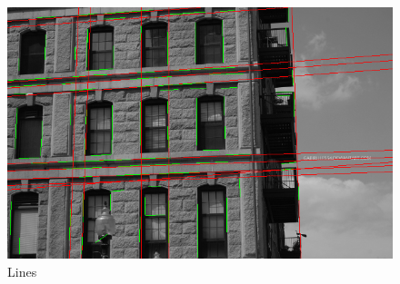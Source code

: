 \begin{figure}[H]
\begin{minipage}{0.4\textwidth}
  \end{minipage}
  \begin{minipage}{0.4\textwidth}
    \includegraphics[width=\textwidth]{images/08-example-lines.png}
    \caption{Lines}
    \label{fig:08-lines}
  \end{minipage}
\end{figure}
